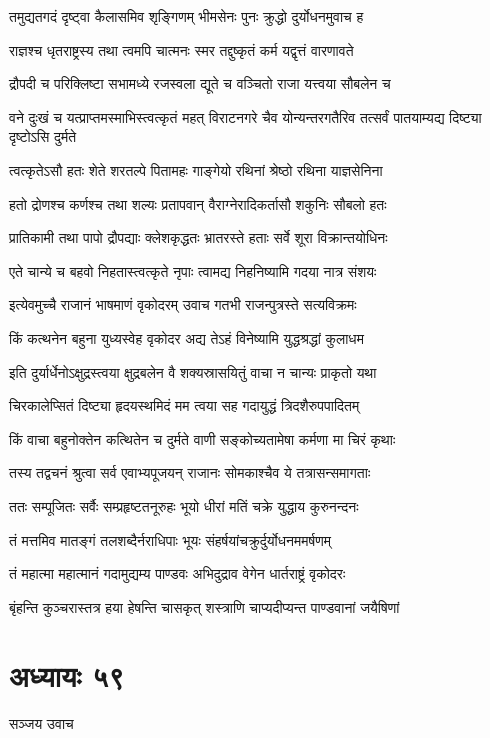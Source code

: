 \twolineshloka
{तमुद्यतगदं दृष्ट्वा कैलासमिव शृङ्गिणम्}
{भीमसेनः पुनः क्रुद्धो दुर्योधनमुवाच ह}


\twolineshloka
{राज्ञश्च धृतराष्ट्रस्य तथा त्वमपि चात्मनः}
{स्मर तद्दुष्कृतं कर्म यद्वृत्तं वारणावते}


\twolineshloka
{द्रौपदी च परिक्लिष्टा सभामध्ये रजस्वला}
{द्यूते च वञ्चितो राजा यत्त्वया सौबलेन च}


\threelineshloka
{वने दुःखं च यत्प्राप्तमस्माभिस्त्वत्कृतं महत्}
{विराटनगरे चैव योन्यन्तरगतैरिव}
{तत्सर्वं पातयाम्यद्य दिष्ट्या दृष्टोऽसि दुर्मते}


\twolineshloka
{त्वत्कृतेऽसौ हतः शेते शरतल्पे पितामहः}
{गाङ्गेयो रथिनां श्रेष्ठो रथिना याज्ञसेनिना}


\twolineshloka
{हतो द्रोणश्च कर्णश्च तथा शल्यः प्रतापवान्}
{वैराग्नेरादिकर्तासौ शकुनिः सौबलो हतः}


\twolineshloka
{प्रातिकामी तथा पापो द्रौपद्याः क्लेशकृद्धतः}
{भ्रातरस्ते हताः सर्वे शूरा विक्रान्तयोधिनः}


\twolineshloka
{एते चान्ये च बहवो निहतास्त्वत्कृते नृपाः}
{त्वामद्य निहनिष्यामि गदया नात्र संशयः}


\twolineshloka
{इत्येवमुच्चै राजानं भाषमाणं वृकोदरम्}
{उवाच गतभी राजन्पुत्रस्ते सत्यविक्रमः}


\twolineshloka
{किं कत्थनेन बहुना युध्यस्वेह वृकोदर}
{अद्य तेऽहं विनेष्यामि युद्धश्रद्धां कुलाधम}


\twolineshloka
{इति दुर्यार्धेनोऽक्षुद्रस्त्वया क्षुद्रबलेन वै}
{शक्यस्रासयितुं वाचा न चान्यः प्राकृतो यथा}


\twolineshloka
{चिरकालेप्सितं दिष्ट्या हृदयस्थमिदं मम}
{त्वया सह गदायुद्धं त्रिदशैरुपपादितम्}


\twolineshloka
{किं वाचा बहुनोक्तेन कत्थितेन च दुर्मते}
{वाणी सङ्कोच्यतामेषा कर्मणा मा चिरं कृथाः}


\twolineshloka
{तस्य तद्वचनं श्रुत्वा सर्व एवाभ्यपूजयन्}
{राजानः सोमकाश्चैव ये तत्रासन्समागताः}


\twolineshloka
{ततः सम्पूजितः सर्वैः सम्प्रहृष्टतनूरुहः}
{भूयो धीरां मतिं चक्रे युद्धाय कुरुनन्दनः}


\twolineshloka
{तं मत्तमिव मातङ्गं तलशब्दैर्नराधिपाः}
{भूयः संहर्षयांचक्रुर्दुर्योधनममर्षणम्}


\twolineshloka
{तं महात्मा महात्मानं गदामुद्यम्य पाण्डवः}
{अभिदुद्राव वेगेन धार्तराष्ट्रं वृकोदरः}


\twolineshloka
{बृंहन्ति कुञ्चरास्तत्र हया हेषन्ति चासकृत्}
{शस्त्राणि चाप्यदीप्यन्त पाण्डवानां जयैषिणां}


\chapter{अध्यायः ५९}
\twolineshloka
{सञ्जय उवाच}
{}


